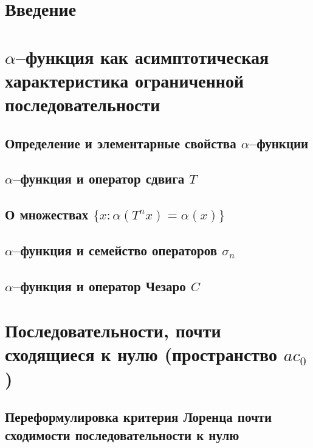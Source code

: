 \documentclass[a4paper,openbib]{report}
\theoremstyle{definition}
\begin{document}
\setcounter{page}{2}
\tableofcontents

\chapter*{Введение}


\chapter{$\alpha$--функция как асимптотическая характеристика ограниченной последовательности}

	\section{Определение и элементарные свойства $\alpha$--функции}
	

	\section{$\alpha$--функция и оператор сдвига $T$}
	

	\section{О множествах $\{x: \alpha(T^n x) = \alpha(x)\}$}
	

	\section{$\alpha$--функция и семейство операторов $\sigma_n$}
	

	\section{$\alpha$--функция и оператор Чезаро $C$}
	

\chapter{Последовательности, почти сходящиеся к нулю (пространство $ac_0$)}

	\section{Переформулировка критерия Лоренца почти сходимости последовательности к нулю}
	
\end{document}
